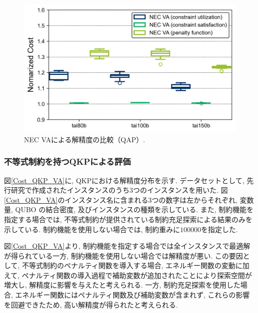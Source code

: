 \documentclass[submit,techrep,noauthor]{ipsj}
\begin{document}

\begin{figure}[tb]
\centering
\includegraphics[bb=0 0 700 230, width=15cm]{Cost_QAP_VA.png}
\caption{NEC VAによる解精度の比較（QAP）.}
\label{Cost_QAP_VA}
\end{figure}

\subsubsection{不等式制約を持つQKPによる評価}
図\ref{Cost_QKP_VA}に, QKPにおける解精度分布を示す. データセットとして, 先行研究で作成されたインスタンス\cite{qkplib}のうち3つのインスタンスを用いた. 図\ref{Cost_QKP_VA}のインスタンス名に含まれる3つの数字は左からそれぞれ, 変数量, QUBO の結合密度, 及びインスタンスの種類を示している. また, 制約機能を指定する場合では, 不等式制約が提供されている制約充足探索による結果のみを示している. 制約機能を使用しない場合では, 制約重みに$100000$を指定した.

図\ref{Cost_QKP_VA}より, 制約機能を指定する場合では全インスタンスで最適解が得られている一方, 制約機能を使用しない場合では解精度が悪い. この要因として, 不等式制約のペナルティ関数を導入する場合, エネルギー関数の変動に加えて, ペナルティ関数の導入過程で補助変数が追加されたことにより探索空間が増大し, 解精度に影響を与えたと考えられる. 一方, 制約充足探索を使用した場合, エネルギー関数にはペナルティ関数及び補助変数が含まれず, これらの影響を回避できたため, 高い解精度が得られたと考えられる.
\end{document}
